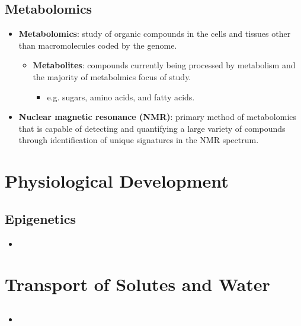 \documentclass[12pt,a4paper]{article}
\begin{document}
\subsection{Metabolomics}
\begin{itemize}
    \item \textbf{Metabolomics}: study of organic compounds in the cells and tissues other than macromolecules coded by the genome.
        \begin{itemize}
            \item \textbf{Metabolites}: compounds currently being processed by metabolism and the majority of metabolmics focus of study.
                \begin{itemize}
                    \item e.g. sugars, amino acids, and fatty acids.
                \end{itemize}
        \end{itemize}
    \item \textbf{Nuclear magnetic resonance (NMR)}: primary method of metabolomics that is capable of detecting and quantifying a large variety of compounds through identification of unique signatures in the NMR spectrum.
\end{itemize}

\clearpage
\section{Physiological Development}
\subsection{Epigenetics}
\begin{itemize}
    \item 
\end{itemize}

\clearpage
\section{Transport of Solutes and Water}
\subsection{}
\begin{itemize}
    \item 
\end{itemize}
\end{document}
